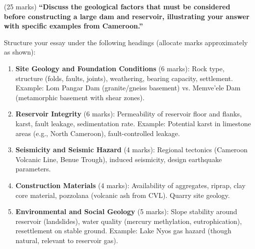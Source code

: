 \documentclass[11pt]{article}
\newcommand{\cle}[1]{{\popxbold\color{popdark}#1}}
\begin{document}
\begin{exercice} (25 marks)
\textbf{``Discuss the geological factors that must be considered before constructing a large dam and reservoir, illustrating your answer with specific examples from Cameroon.''}

Structure your essay under the following headings (allocate marks approximately as shown):
\begin{enumerate}
\item \textbf{Site Geology and Foundation Conditions} (6 marks): Rock type, structure (folds, faults, joints), weathering, bearing capacity, settlement. Example: \cle{Lom Pangar Dam} (granite/gneiss basement) vs. \cle{Memve'ele Dam} (metamorphic basement with shear zones).
\item \textbf{Reservoir Integrity} (6 marks): Permeability of reservoir floor and flanks, karst, fault leakage, sedimentation rate. Example: Potential karst in limestone areas (e.g., North Cameroon), fault-controlled leakage.
\item \textbf{Seismicity and Seismic Hazard} (4 marks): Regional tectonics (Cameroon Volcanic Line, Benue Trough), induced seismicity, design earthquake parameters.
\item \textbf{Construction Materials} (4 marks): Availability of aggregates, riprap, clay core material, pozzolana (volcanic ash from CVL). Quarry site geology.
\item \textbf{Environmental and Social Geology} (5 marks): Slope stability around reservoir (landslides), water quality (mercury methylation, eutrophication), resettlement on stable ground. Example: \cle{Lake Nyos} gas hazard (though natural, relevant to reservoir gas).
\end{enumerate}
\end{exercice}
\end{document}
